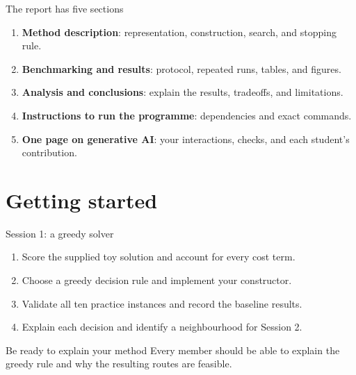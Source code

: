 \documentclass[table]{customIMTbeamer/imt_pres}
\begin{document}
\begin{frame}{The report has five sections}
\begin{enumerate}
\item \textbf{Method description}: representation, construction, search, and stopping rule.
\item \textbf{Benchmarking and results}: protocol, repeated runs, tables, and figures.
\item \textbf{Analysis and conclusions}: explain the results, tradeoffs, and limitations.
\item \textbf{Instructions to run the programme}: dependencies and exact commands.
\item \textbf{One page on generative AI}: your interactions, checks, and each student's contribution.
\end{enumerate}
\end{frame}

\section*{Getting started}
\begin{frame}{Session 1: a greedy solver}
\begin{enumerate}
\item Score the supplied toy solution and account for every cost term.
\item Choose a greedy decision rule and implement your constructor.
\item Validate all ten practice instances and record the baseline results.
\item Explain each decision and identify a neighbourhood for Session 2.
\end{enumerate}
\begin{block}{Be ready to explain your method}
Every member should be able to explain the greedy rule and why the resulting routes are feasible.
\end{block}
\end{frame}
\end{document}
